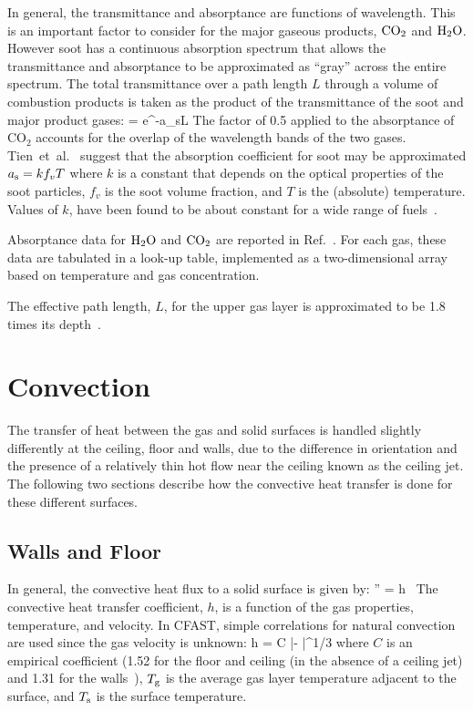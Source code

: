 In general, the transmittance and absorptance are functions of wavelength. This is an important factor to consider for the major gaseous products, $\textnormal{CO}_2$  and $\textnormal{H}_2 \textnormal{O}$. However soot has a continuous absorption spectrum that allows the transmittance and absorptance to be approximated as ``gray'' \cite{SiegelandHowell:1981} across the entire spectrum. The total transmittance over a path length $L$ through a volume of combustion products is taken as the product of the transmittance of the soot and major product gases:
\be
   \tau = e^{-a_{\rm s}L} 
\ee
The factor of 0.5 applied to the absorptance of CO$_2$ accounts for the overlap of the wavelength bands of the two gases. Tien~et~al.~\cite{Tien:2002} suggest that the absorption coefficient for soot may be approximated $a_{\rm s} = k f_v T$ where $k$ is a constant that depends on the optical properties of the soot particles, $f_v$ is the soot volume fraction, and $T$ is the (absolute) temperature. Values of $k$, have been found to be about constant for a wide range of fuels~\cite{Tien:1978}.

Absorptance data for $\textnormal{H}_2 \textnormal{O}$ and $\textnormal{CO}_2$ are reported in Ref.~\cite{Edwards:1985}. For each gas, these data are tabulated in a look-up table, implemented as a two-dimensional array based on temperature and gas concentration.

The effective path length, $L$, for the upper gas layer is approximated to be 1.8 times its depth~\cite{Tien:2002}.




\section{Convection}

The transfer of heat between the gas and solid surfaces is handled slightly differently at the ceiling, floor and walls, due to the difference in orientation and the presence of a relatively thin hot flow near the ceiling known as the ceiling jet. The following two sections describe how the convective heat transfer is done for these different surfaces.

\subsection{Walls and Floor}

In general, the convective heat flux to a solid surface is given by:
\be
   \dqc'' = h \, \brackets{\Tg - \Ts}  \label{convective_heat_flux}
\ee
The convective heat transfer coefficient, $h$, is a function of the gas properties, temperature, and velocity. In CFAST, simple correlations for natural convection are used since the gas velocity is unknown:
\be
   h = C {|\Tg - \Ts|}^{1/3}
\ee
where $C$ is an empirical coefficient (1.52 for the floor and ceiling (in the absence of a ceiling jet) and 1.31 for the walls~\cite{Holman:1990}), $T_{\rm g}$ is the average gas layer temperature adjacent to the surface, and $T_{\rm s}$ is the surface temperature.

